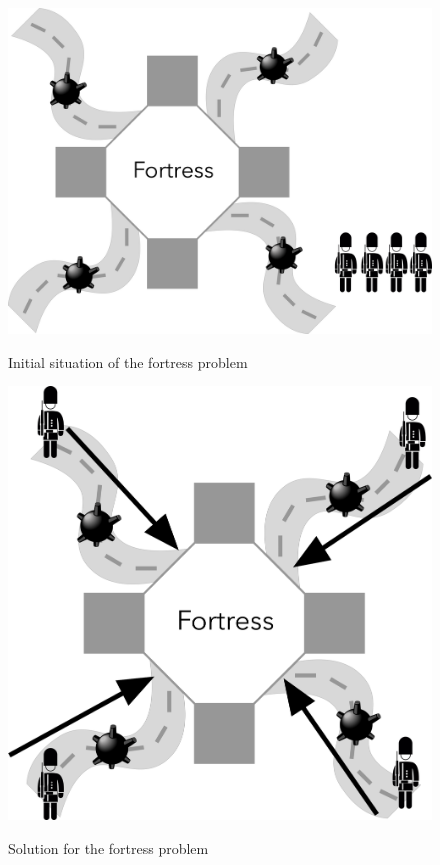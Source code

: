 \documentclass[12pt]{article}
\begin{document}
\begin{figure}[H]
    \centering
    \begin{minipage}[b]{0.45\textwidth}
    	\includegraphics[scale=0.08]{images/fortress_problem.png}
    	\caption{Initial situation of the fortress problem}
    	\centering
    	\label{fig:fortress}
    \end{minipage}
    \hfill
    \begin{minipage}[b]{0.45\textwidth}
    	\includegraphics[scale=0.08]{images/fortress_problem_solution.png}
    	\caption{Solution for the fortress problem}
    	\centering
    	\label{fig:fortress_solution}
    \end{minipage}
\end{figure}
\end{document}
